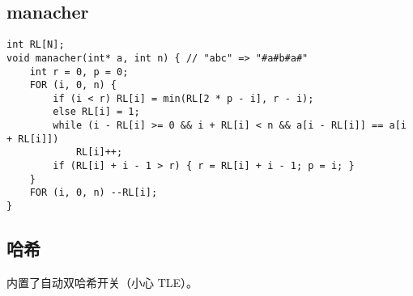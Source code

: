 \documentclass[]{article}
\begin{document}
\hypertarget{manacher}{%
\subsection{manacher}\label{manacher}}

\begin{verbatim}
int RL[N];
void manacher(int* a, int n) { // "abc" => "#a#b#a#"
    int r = 0, p = 0;
    FOR (i, 0, n) {
        if (i < r) RL[i] = min(RL[2 * p - i], r - i);
        else RL[i] = 1;
        while (i - RL[i] >= 0 && i + RL[i] < n && a[i - RL[i]] == a[i + RL[i]])
            RL[i]++;
        if (RL[i] + i - 1 > r) { r = RL[i] + i - 1; p = i; }
    }
    FOR (i, 0, n) --RL[i];
}

\end{verbatim}

\hypertarget{ux54c8ux5e0c}{%
\subsection{哈希}\label{ux54c8ux5e0c}}

内置了自动双哈希开关（小心 TLE）。
\end{document}
